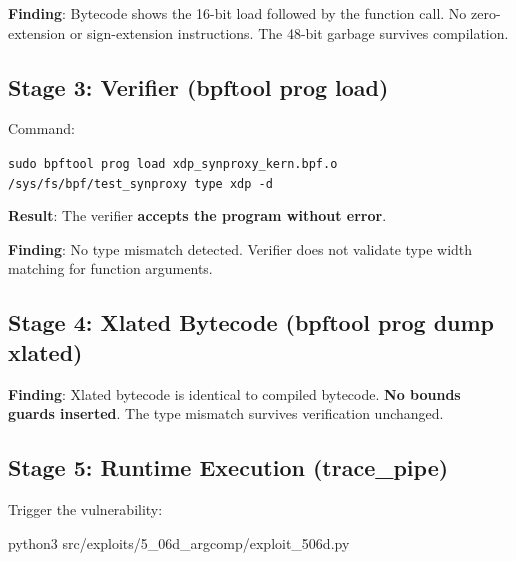 \noindent
\textbf{Finding}: Bytecode shows the 16-bit load followed by the function call. No zero-extension or sign-extension instructions. The 48-bit garbage survives compilation.

\subsection{Stage 3: Verifier (bpftool prog load)}

Command:
\begin{tcolorbox}[colback=gray!10, colframe=gray!10, arc=2pt, boxrule=0pt]
\small\ttfamily
\texttt{sudo bpftool prog load xdp\_synproxy\_kern.bpf.o /sys/fs/bpf/test\_synproxy type xdp -d}
\end{tcolorbox}

\noindent
\textbf{Result}: The verifier \textbf{accepts the program without error}.

\noindent
\textbf{Finding}: No type mismatch detected. Verifier does not validate type width matching for function arguments.

\subsection{Stage 4: Xlated Bytecode (bpftool prog dump xlated)}

\vspace{0.3cm}
\noindent
{}
\vspace{0.3cm}

\noindent
\textbf{Finding}: Xlated bytecode is identical to compiled bytecode. \textbf{No bounds guards inserted}. The type mismatch survives verification unchanged.

\subsection{Stage 5: Runtime Execution (trace\_pipe)}

Trigger the vulnerability:

\begin{tcolorbox}[colback=gray!10, colframe=gray!10, arc=2pt, boxrule=0pt]
\small\ttfamily
python3 src/exploits/5\_06d\_argcomp/exploit\_506d.py
\end{tcolorbox}

